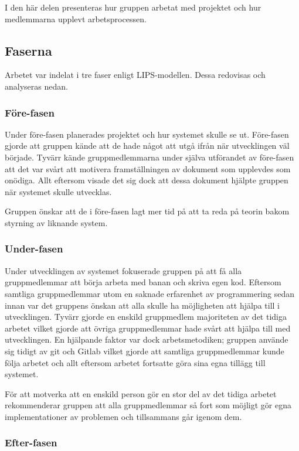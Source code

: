 \documentclass[10pt,oneside,swedish]{lips}
\begin{document}
I den här delen presenteras hur gruppen arbetat med projektet och hur
medlemmarna upplevt arbetsprocessen.

\subsection{Faserna} \label{sec:faser}

Arbetet var indelat i tre faser enligt LIPS-modellen. Dessa redovisas och
analyseras nedan.

\subsubsection{Före-fasen}

Under före-fasen planerades projektet och hur systemet skulle se ut. Före-fasen
gjorde att gruppen kände att de hade något att utgå ifrån när utvecklingen väl
började. Tyvärr kände gruppmedlemmarna under själva utförandet av före-fasen att
det var svårt att motivera framställningen av dokument som upplevdes som
onödiga. Allt eftersom visade det sig dock att dessa dokument hjälpte gruppen
när systemet skulle utvecklas.

Gruppen önskar att de i före-fasen lagt mer tid på att ta reda på teorin bakom
styrning av liknande system.

\subsubsection{Under-fasen}

Under utvecklingen av systemet fokuserade gruppen på att få alla gruppmedlemmar
att börja arbeta med banan och skriva egen kod. Eftersom samtliga gruppmedlemmar
utom en saknade erfarenhet av programmering sedan innan var det gruppens önskan
att alla skulle ha möjligheten att hjälpa till i utvecklingen. Tyvärr gjorde en
enskild gruppmedlem majoriteten av det tidiga arbetet vilket gjorde att övriga
gruppmedlemmar hade svårt att hjälpa till med utvecklingen. En hjälpande faktor
var dock arbetsmetodiken; gruppen använde sig tidigt av git och Gitlab vilket
gjorde att samtliga gruppmedlemmar kunde följa arbetet och allt eftersom arbetet
fortsatte göra sina egna tillägg till systemet.

För att motverka att en enskild person gör en stor del av det tidiga
arbetet rekommenderar gruppen att alla gruppmedlemmar så fort som möjligt gör
egna implementationer av problemen och tillsammans går igenom dem.

\subsubsection{Efter-fasen}
\end{document}
